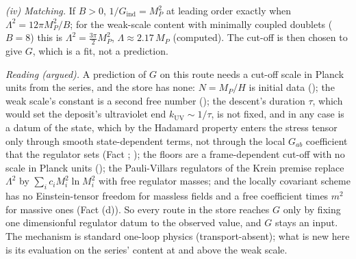 \emph{(iv) Matching.} If $B > 0$, $1/G_{\mathrm{ind}} = M_{P}^{2}$ at leading order exactly when $\Lambda^{2} = 12\pi M_{P}^{2}/B$; for the weak-scale content with minimally coupled doublets ($B = 8$) this is $\Lambda^{2} = \tfrac{3\pi}{2}M_{P}^{2}$, $\Lambda \approx 2.17\,M_{P}$ (computed). The cut-off is then chosen to give $G$, which is a fit, not a prediction.

\emph{Reading (argued).} A prediction of $G$ on this route needs a cut-off scale in Planck units from the series, and the store has none: $N = M_{P}/H$ is initial data (); the weak scale's constant is a second free number (); the descent's duration $\tau$, which would set the deposit's ultraviolet end $k_{\mathrm{UV}} \sim 1/\tau$, is not fixed, and in any case is a datum of the state, which by the Hadamard property enters the stress tensor only through smooth state-dependent terms, not through the local $G_{ab}$ coefficient that the regulator sets (Fact ; ); the floors are a frame-dependent cut-off with no scale in Planck units (); the Pauli-Villars regulators of the Krein premise replace $\Lambda^{2}$ by $\sum_{i}c_{i}M_{i}^{2}\ln M_{i}^{2}$ with free regulator masses; and the locally covariant scheme has no Einstein-tensor freedom for massless fields and a free coefficient times $m^{2}$ for massive ones (Fact (d)). So every route in the store reaches $G$ only by fixing one dimensionful regulator datum to the observed value, and $G$ stays an input. The mechanism is standard one-loop physics (transport-absent); what is new here is its evaluation on the series' content at and above the weak scale.
